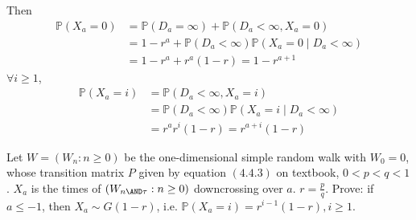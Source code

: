 \documentclass{ctexart}
\begin{document}
\begin{solution}
\begin{enumerate}
      Then \[
        \begin{aligned}
          \mathbb{P}(X_a=0) & =\mathbb{P}(D_a=\infty) + \mathbb{P}(D_a < \infty, X_a=0)            \\
                            & =1-r^a + \mathbb{P}(D_a < \infty)\mathbb{P}(X_a=0 \mid D_a < \infty) \\
                            & =1-r^a + r^a(1-r)=1-r^{a + 1}
        \end{aligned}
      \]
      \(\forall i \geq 1\),
      \[
        \begin{aligned}
          \mathbb{P}(X_a=i) & =\mathbb{P}(D_a< \infty,X_a=i)                                    \\
                            & =    \mathbb{P}(D_a< \infty)\mathbb{P}(X_a = i \mid D_a < \infty) \\
                            & =r^ar^i(1-r)=r^{a + i}(1-r)
        \end{aligned}
      \]
  \end{enumerate}
\end{solution}
\begin{problem}\label{pro:4}
  Let \(W=(W_n:n \geq 0)\) be the one-dimensional simple random walk with \(W_0=0\),
  whose transition matrix \(P\) given by equation \((4.4.3)\)
  on textbook, \(0< p<q<1\).
  \(X_a\) is the times of \((W_{n \AND \tau}:n \geq 0)\) downcrossing over \(a\).
  \(r=\frac{p}{q}\).
  Prove: if \(a \leq -1\), then \(X_a \sim G(1-r)\), i.e. \(\mathbb{P}(X_a=i)=r^{i-1}(1-r),i \geq 1\).
\end{problem}
\begin{solution}

\end{solution}
\end{document}
